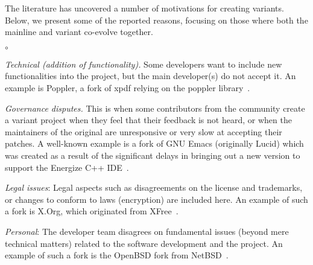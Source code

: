 The literature has uncovered a number of motivations for creating variants. Below, we present some of the reported reasons, focusing on those where both the mainline and variant co-evolve together.


\begin{list}{$\circ$}{}
   \item \textit{Technical (addition of functionality).} Some developers want to include new functionalities into the project, but the main developer(s) do not accept it. An example is \textsf{Poppler}, a fork of \textsf{xpdf} relying on the \textsf{poppler} library~\cite{Gregorio:2012}.

    \item \textit{Governance disputes.} This is when some contributors from the community create a variant project when they feel that their feedback is not heard, or when the maintainers of the original are unresponsive or very slow at accepting their patches. A well-known example is a fork of \textsf{GNU Emacs} (originally \textsf{Lucid}) which was created as a result of the significant delays in bringing out a new version to support the Energize C++ IDE~\cite{Wheeler:2015Forking}.

\item \textit{Legal issues}: Legal aspects such as disagreements on the license and trademarks, or changes to conform to laws (encryption) are included here. An example of such a fork is \textsf{X.Org}, which originated from \textsf{XFree}~\cite{Gregorio:2012,Wheeler:2015Forking}.

\item \textit{Personal}: The developer team disagrees on fundamental issues (beyond mere technical matters) related to the software development and the project. An example of such a fork is the \textsf{OpenBSD} fork from \textsf{NetBSD}~\cite{Gregorio:2012}.


\end{list}

